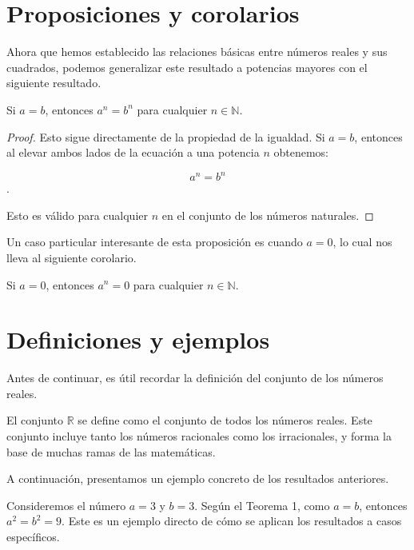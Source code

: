\section{Proposiciones y corolarios}

Ahora que hemos establecido las relaciones básicas entre números reales y sus cuadrados, podemos generalizar este resultado a potencias mayores con el siguiente resultado.

\begin{proposition}
Si $a = b$, entonces $a^n = b^n$ para cualquier $n \in \mathbb{N}$.
\end{proposition}

\begin{proof}
Esto sigue directamente de la propiedad de la igualdad. Si $a = b$, entonces al elevar ambos lados de la ecuación a una potencia $n$ obtenemos:

$$a^n = b^n$$.

Esto es válido para cualquier $n$ en el conjunto de los números naturales.
\end{proof}

Un caso particular interesante de esta proposición es cuando $a = 0$, lo cual nos lleva al siguiente corolario.

\begin{corollary}
Si $a = 0$, entonces $a^n = 0$ para cualquier $n \in \mathbb{N}$.
\end{corollary}

\section{Definiciones y ejemplos}

Antes de continuar, es útil recordar la definición del conjunto de los números reales.

\begin{definition}
El conjunto $\mathbb{R}$ se define como el conjunto de todos los números reales. Este conjunto incluye tanto los números racionales como los irracionales, y forma la base de muchas ramas de las matemáticas.
\end{definition}

A continuación, presentamos un ejemplo concreto de los resultados anteriores.

\begin{example}
Consideremos el número $a = 3$ y $b = 3$. Según el Teorema 1, como $a = b$, entonces $a^2 = b^2 = 9$. Este es un ejemplo directo de cómo se aplican los resultados a casos específicos.
\end{example}

